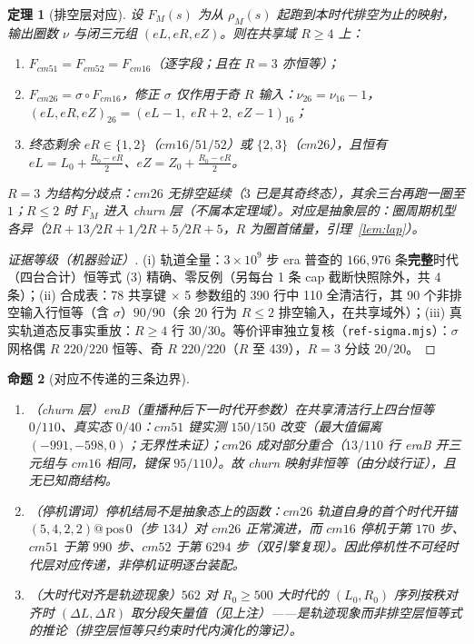 \documentclass[11pt]{ctexart}
\newtheorem{theorem}{定理}[section]
\newtheorem{proposition}[theorem]{命题}
\begin{document}
\begin{theorem}[排空层对应]\label{thm:drain}
设 $F_M(s)$ 为从 $\rho_M(s)$ 起跑到本时代排空为止的映射，输出圈数 $\nu$ 与闭三元组 $(eL,eR,eZ)$。则在共享域 $R\ge4$ 上：
\begin{enumerate}
\item $F_{cm51}=F_{cm52}=F_{cm16}$（逐字段；且在 $R=3$ 亦恒等）；
\item $F_{cm26}=\sigma\circ F_{cm16}$，修正 $\sigma$ 仅作用于奇 $R$ 输入：$\nu_{26}=\nu_{16}-1$，$(eL,eR,eZ)_{26}=(eL-1,\;eR+2,\;eZ-1)_{16}$；
\item 终态剩余 $eR\in\{1,2\}$（$cm16/51/52$）或 $\{2,3\}$（$cm26$），且恒有 $eL=L_0+\tfrac{R_0-eR}{2}$、$eZ=Z_0+\tfrac{R_0-eR}{2}$。
\end{enumerate}
$R=3$ 为结构分歧点：$cm26$ 无排空延续（$3$ 已是其奇终态），其余三台再跑一圈至 $1$；$R\le2$ 时 $F_M$ 进入 churn 层（不属本定理域）。对应是抽象层的：圈周期机型各异（$2R{+}13$/$2R{+}1$/$2R{+}5$/$2R{+}5$，$R$ 为圈首储量，引理~\ref{lem:lap}）。
\end{theorem}
\begin{proof}[证据等级（机器验证）]
(i) 轨道全量：$3\times10^9$ 步 era 普查的 $166{,}976$ 条\textbf{完整}时代（四台合计）恒等式 (3) 精确、零反例（另每台 1 条 cap 截断快照除外，共 4 条）；(ii) 合成表：78 共享键 $\times$ 5 参数组的 390 行中 110 全清洁行，其 90 个非排空输入行恒等（含 $\sigma$）$90/90$（余 20 行为 $R\le2$ 排空输入，在共享域外）；(iii) 真实轨道态反事实重放：$R\ge4$ 行 $30/30$。等价评审独立复核（\texttt{ref-sigma.mjs}）：$\sigma$ 网格偶 $R$ $220/220$ 恒等、奇 $R$ $220/220$（$R$ 至 439），$R=3$ 分歧 $20/20$。
\end{proof}

\begin{proposition}[对应不传递的三条边界]\label{prop:boundary}
\begin{enumerate}
\item（churn 层）eraB（重播种后下一时代开参数）在共享清洁行上四台恒等 $0/110$、真实态 $0/40$：$cm51$ 键实测 $150/150$ 改变（最大值偏离 $(-991,-598,0)$；无界性未证）；$cm26$ 成对部分重合（$13/110$ 行 eraB 开三元组与 $cm16$ 相同，键保 $95/110$）。故 churn 映射非恒等（由分歧行证），且无已知商结构。
\item（停机谓词）停机结局不是抽象态上的函数：$cm26$ 轨道自身的首个时代开锚 $(5,4,2,2)@\,\mathrm{pos}\,0$（步 $134$）对 $cm26$ 正常演进，而 $cm16$ 停机于第 $170$ 步、$cm51$ 于第 $990$ 步、$cm52$ 于第 $6294$ 步（双引擎复现）。因此停机性不可经时代层对应传递，非停机证明逐台装配。
\item（大时代对齐是轨迹现象）$562$ 对 $R_0\ge500$ 大时代的 $(L_0,R_0)$ 序列按秩对齐时 $(\Delta L,\Delta R)$ 取分段矢量值（见上注）——是轨迹现象而非排空层恒等式的推论（排空层恒等只约束时代内演化的簿记）。
\end{enumerate}
\end{proposition}
\end{document}
